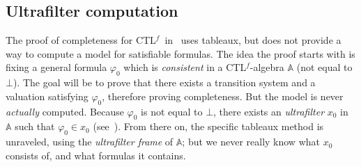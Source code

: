 \documentclass[11pt]{article}
\newcommand{\A}{{\mathbb{A}}}
\newcommand{\CTLf}{{CTL$^f$}}
\newcommand{\phii}{{\varphi}}
\theoremstyle{definition}
\begin{document}
\subsection*{Ultrafilter computation}

The proof of completeness for \CTLf~in~\cite[Section 3]{GhivG16} uses tableaux, but does not provide a way to compute a model for satisfiable formulas.
The idea the proof starts with is fixing a general formula $\phii_0$ which is \emph{consistent} in a \CTLf-algebra $\A$ (not equal to $\bot$).
The goal will be to prove that there exists a transition system  and a valuation satisfying $\phii_0$, therefore proving completeness. But 
the model is never \emph{actually} computed. Because $\phii_0$ is not equal to $\bot$, there exists an \emph{ultrafilter} $x_0$
in $\A$ such that $\phii_0 \in x_0$ (see~\cite[Section 3.3]{GehvG22}). From there on, the specific tableaux method is unraveled, using the 
\emph{ultrafilter frame} of $\A$; but we never really know what $x_0$ consists of, and what formulas it contains.
\end{document}

